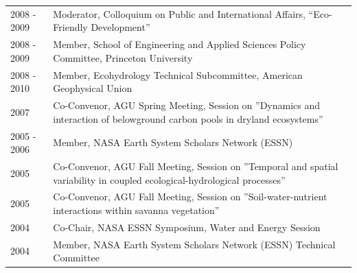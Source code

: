\begin{longtable}{l p{5.5in}}
2008 - 2009 & Moderator, Colloquium on Public and International Affairs, ``Eco-Friendly Development'' \\
2008 - 2009 & Member, School of Engineering and Applied Sciences Policy Committee, Princeton University \\
2008 - 2010 & Member, Ecohydrology Technical Subcommittee, American Geophysical Union \\
2007 & Co-Convenor, AGU Spring Meeting, Session on ''Dynamics and interaction of belowground carbon pools in dryland ecosystems'' \\
2005 - 2006 & Member, NASA Earth System Scholars Network (ESSN) \\
2005 & Co-Convenor, AGU Fall Meeting, Session on ''Temporal and spatial variability in coupled ecological-hydrological processes'' \\
2005 & Co-Convenor, AGU Fall Meeting, Session on ''Soil-water-nutrient interactions within savanna vegetation'' \\
2004 & Co-Chair, NASA ESSN Symposium, Water and Energy Session \\
2004 & Member, NASA Earth System Scholars Network (ESSN) Technical Committee \\

\end{longtable}

